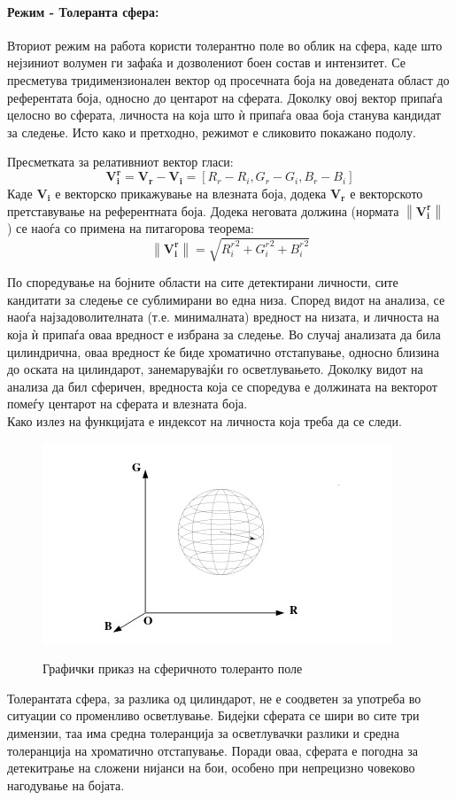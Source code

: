 \documentclass[12pt]{article}
\newcommand\norm[1]{\left\lVert#1\right\rVert}
\renewcommand{\vec}[1]{\mathbf{#1}}
\begin{document}
      \paragraph{Режим - Толеранта сфера:\\}
        Вториот режим на работа користи толерантно поле во облик на сфера, каде што нејзиниот волумен ги зафаќа и дозволениот боен состав и интензитет. Се пресметува тридимензионален вектор од просечната боја на доведената област до референтата боја, односно до центарот на сферата. Доколку овој вектор припаѓа целосно во сферата, личноста на која што ѝ припаѓа оваа боја станува кандидат за следење. Исто како и претходно, режимот е сликовито покажано подолу.

        Пресметката за релативниот вектор гласи:
        $$ \vec{V_i^r} = \vec{V_r} - \vec{V_i}= [R_r - R_i, G_r - G_i, B_r - B_i] $$
        Каде $\vec{V_i}$ е векторско прикажување на влезната боја, додека $\vec{V_r}$ е векторското претставување на референтната боја.
        Додека неговата должина (нормата $\norm{\vec{V_i^r}}$ ) се наоѓа со примена на питагорова теорема:
        $$ \norm{\vec{V_i^r}} = \sqrt{{R_i^r}^2 + {G_i^r}^2 + {B_i^r}^2} $$

        По споредување на бојните области на сите детектирани личности, сите кандитати за следење се сублимирани во една низа. Според видот на анализа, се наоѓа најзадоволителната (т.е. минималната) вредност на низата, и личноста на која ѝ припаѓа оваа вредност е избрана за следење. Во случај анализата да била цилиндрична, оваа вредност ќе биде хроматично отстапување, односно близина до оската на цилиндарот, занемарувајќи го осветлувањето. Доколку видот на анализа да бил сферичен, вредноста која се споредува е должината на векторот помеѓу центарот на сферата и влезната боја.
        \\
        Како излез на функцијата е индексот на личноста која треба да се следи.

        \begin{figure}[H]
          \centering
          \includegraphics[width = 0.45\linewidth]{./images/sphere.png}
          \label{fig:sphere}
          \caption{Графички приказ на сферичното толеранто поле}
        \end{figure}
        Толерантата сфера, за разлика од цилиндарот, не е соодветен за употреба во ситуации со променливо осветлување. Бидејки сферата се шири во сите три димензии, таа има средна толеранција за осветлувачки разлики и средна толеранција на хроматично отстапување. Поради оваа, сферата е погодна за детекитрање на сложени нијанси на бои, особено при непрецизно човеково нагодување на бојата.
\end{document}
